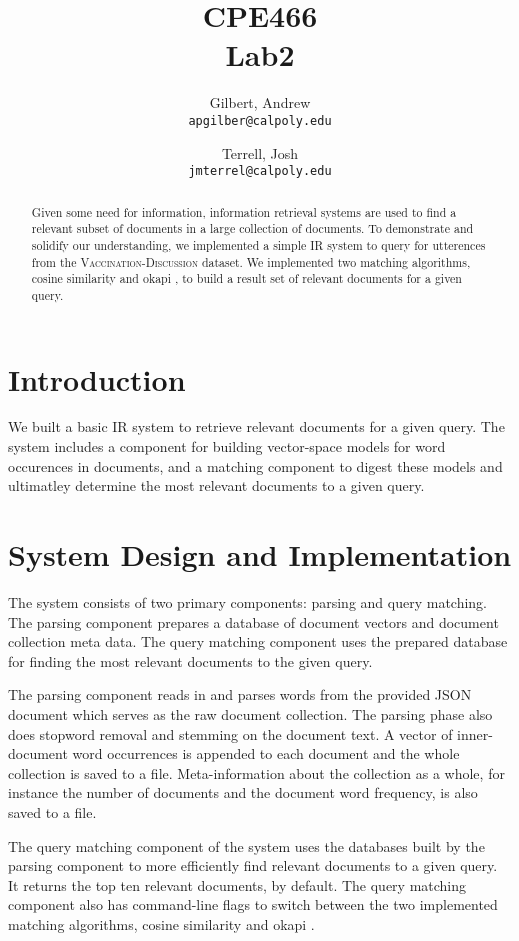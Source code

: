 \documentclass[draft]{report}
\title{CPE466\\Lab2}
\author{
  Gilbert, Andrew\\
  \texttt{apgilber@calpoly.edu}
  \and
  Terrell, Josh\\
  \texttt{jmterrel@calpoly.edu}
}
\date{}
\newcommand{\okapi}{okapi }
\newcommand{\cosine}{cosine similarity }
\begin{document}
\maketitle

\begin{abstract}
Given some need for information, information retrieval systems are
used to find a relevant subset of documents in a large collection of
documents. To demonstrate and solidify our understanding, we
implemented a simple IR system to query for utterences from the
\textsc{Vaccination-Discussion} dataset. We implemented two matching
algorithms, \cosine and \okapi, to build a
result set of relevant documents for a given query.
\end{abstract}

\section{Introduction}
We built a basic IR system to retrieve relevant documents for a given
query. The system includes a component for building vector-space
models for word occurences in documents, and a matching component to
digest these models and ultimatley determine the most relevant
documents to a given query.

\section{System Design and Implementation}
The system consists of two primary components: parsing and query
matching. The parsing component prepares a database of document
vectors and document collection meta data. The query matching
component uses the prepared database for finding the most relevant
documents to the given query.

The parsing component reads in and parses words from the provided JSON
document which serves as the raw document collection. The parsing
phase also does stopword removal and stemming on the document text. A
vector of inner-document word occurrences is appended to each document
and the whole collection is saved to a file. Meta-information
about the collection as a whole, for instance the number of documents
and the document word frequency, is also saved to a file.

The query matching component of the system uses the databases built by
the parsing component to more efficiently find relevant documents to a
given query. It returns the top ten relevant documents, by
default. The query matching component also has command-line flags to
switch between the two implemented matching algorithms, \cosine and
\okapi.
\end{document}
